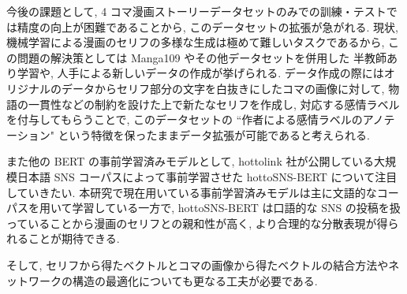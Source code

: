 \documentclass[twocolumn]{jarticle}     %
\begin{document}
今後の課題として, 4 コマ漫画ストーリーデータセットのみでの訓練・テストでは精度の向上が困難であることから, このデータセットの拡張が急がれる. 現状, 機械学習による漫画のセリフの多様な生成は極めて難しいタスクであるから, この問題の解決策としては Manga109 やその他データセットを併用した
半教師あり学習や, 人手による新しいデータの作成が挙げられる. データ作成の際にはオリジナルのデータからセリフ部分の文字を白抜きにしたコマの画像に対して, 物語の一貫性などの制約を設けた上で新たなセリフを作成し, 対応する感情ラベルを付与してもらうことで, このデータセットの ``作者による感情ラベルのアノテーション" という特徴を保ったままデータ拡張が可能であると考えられる.

また他の BERT の事前学習済みモデルとして, hottolink 社が公開している大規模日本語 SNS コーパスによって事前学習させた hottoSNS-BERT \cite{hottoSNS-bert} について注目していきたい. 本研究で現在用いている事前学習済みモデルは主に文語的なコーパスを用いて学習している一方で, hottoSNS-BERT は口語的な SNS の投稿を扱っていることから漫画のセリフとの親和性が高く, より合理的な分散表現が得られることが期待できる.

そして, セリフから得たベクトルとコマの画像から得たベクトルの結合方法やネットワークの構造の最適化についても更なる工夫が必要である.


\begin{table}[!b]
\begin{center}
\caption{実験 1 結果(評価用データ)}
\label{table:result_1}
\end{center}
\end{table}
\end{document}
